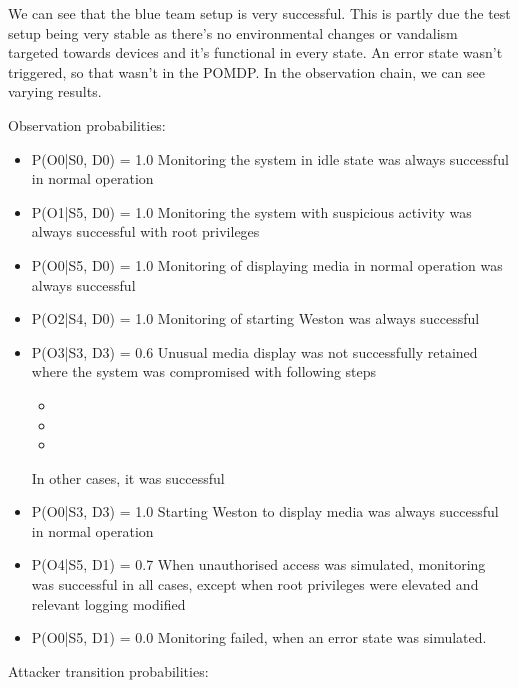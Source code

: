 We can see that the blue team setup is very successful. This is partly due the test setup being very stable as there's no environmental changes or vandalism targeted towards devices and it's functional in every state. An error state wasn't triggered, so that wasn't in the POMDP. In the observation chain, we can see varying results.

Observation probabilities:

\begin{itemize}
\item P(O0|S0, D0) = 1.0
Monitoring the system in idle state was always successful in normal operation
\item P(O1|S5, D0) = 1.0
Monitoring the system with suspicious activity was always successful with root privileges
\item P(O0|S5, D0) = 1.0
Monitoring of displaying media in normal operation was always successful
\item P(O2|S4, D0) = 1.0
Monitoring of starting Weston was always successful
\item P(O3|S3, D3) = 0.6
Unusual media display was not successfully retained where the system was compromised with following steps
\begin{itemize}
    \item 
    \item 
    \item 
\end{itemize}
In other cases, it was successful
\item P(O0|S3, D3) = 1.0
Starting Weston to display media was always successful in normal operation
\item P(O4|S5, D1) = 0.7
When unauthorised access was simulated, monitoring was successful in all cases, except when root privileges were elevated and relevant logging modified
\item P(O0|S5, D1) = 0.0
Monitoring failed, when an error state was simulated.
\end{itemize}

Attacker transition probabilities:

